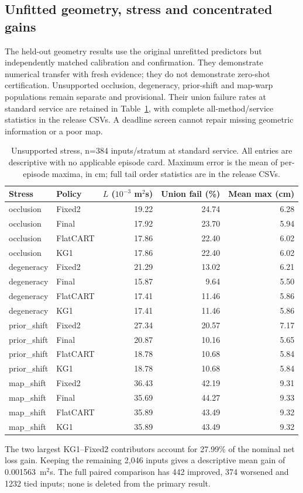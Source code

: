 \subsection{Unfitted geometry, stress and concentrated gains}
The held-out geometry results use the original unrefitted predictors but independently matched calibration and confirmation. They demonstrate numerical transfer with fresh evidence; they do not demonstrate zero-shot certification. Unsupported occlusion, degeneracy, prior-shift and map-warp populations remain separate and provisional. Their union failure rates at standard service are retained in Table~\ref{tab:r8-stress}, with complete all-method/service statistics in the release CSVs. A deadline screen cannot repair missing geometric information or a poor map.
\begin{table}[!htbp]\centering\small
\caption{Unsupported stress, n=384 inputs/stratum at standard service. All entries are descriptive with no applicable episode card. Maximum error is the mean of per-episode maxima, in cm; full tail order statistics are in the release CSVs.}\label{tab:r8-stress}
\begin{tabular}{@{}llrrr@{}}\toprule
Stress & Policy & $L$ ($10^{-3}$ m$^2$s) & Union fail (\%) & Mean max (cm)\\\midrule
occlusion & Fixed2 & 19.22 & 24.74 & 6.28\\
occlusion & Final & 17.92 & 23.70 & 5.94\\
occlusion & FlatCART & 17.86 & 22.40 & 6.02\\
occlusion & KG1 & 17.86 & 22.40 & 6.02\\
degeneracy & Fixed2 & 21.29 & 13.02 & 6.21\\
degeneracy & Final & 15.87 & 9.64 & 5.50\\
degeneracy & FlatCART & 17.41 & 11.46 & 5.86\\
degeneracy & KG1 & 17.41 & 11.46 & 5.86\\
prior\_shift & Fixed2 & 27.34 & 20.57 & 7.17\\
prior\_shift & Final & 20.87 & 10.16 & 5.65\\
prior\_shift & FlatCART & 18.78 & 10.68 & 5.84\\
prior\_shift & KG1 & 18.78 & 10.68 & 5.84\\
map\_shift & Fixed2 & 36.43 & 42.19 & 9.31\\
map\_shift & Final & 35.69 & 44.27 & 9.33\\
map\_shift & FlatCART & 35.89 & 43.49 & 9.32\\
map\_shift & KG1 & 35.89 & 43.49 & 9.32\\
\bottomrule\end{tabular}\end{table}
The two largest KG1--Fixed2 contributors account for 27.99\% of the nominal net loss gain. Keeping the remaining 2,046 inputs gives a descriptive mean gain of 0.001563~m$^2$s. The full paired comparison has 442 improved, 374 worsened and 1232 tied inputs; none is deleted from the primary result.

